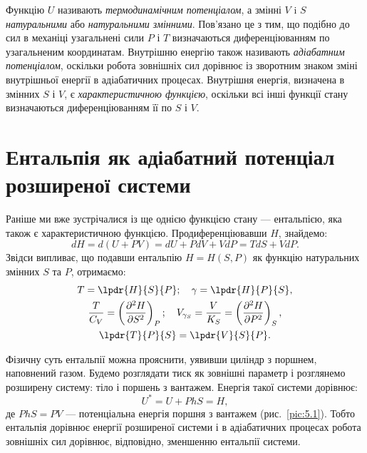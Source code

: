 Функцію $U$ називають \emph{термодинамічним потенціалом}, а змінні $V$ i $S$ \emph{натуральними} або \emph{натуральними змінними}. Пов'язано це з тим, що подібно до сил в механіці узагальнені сили $P$ і $T$ визначаються диференціюванням по узагальненим координатам. Внутрішню енергію також називають \emph{адіабатним потенціалом}, оскільки робота зовнішніх сил дорівнює із зворотним знаком зміні внутрішньої енергії в адіабатичних процесах. Внутрішня енергія, визначена в змінних $S$ і $V$, є \emph{характеристичною функцією}, оскільки всі інші функції стану визначаються диференціюванням її по $S$ і $V$.

\section{Ентальпія як адіабатний потенціал розширеної системи}

Раніше ми вже зустрічалися із ще однією функцією стану --- ентальпією, яка також є характеристичною функцією. Продиференціювавши $H$, знайдемо:
\begin{equation}\label{5.7}
	dH = d(U+PV) = dU + PdV + VdP = TdS + VdP.
\end{equation}
Звідси випливає, що подавши ентальпію $H=H(S,P)$ як функцію натуральних змінних $S$ та $P$, отримаємо:
\begin{gather}
	T = \lpdr{H}{S}{P}; \quad \gamma = \lpdr{H}{P}{S}, \label{5.8} \\
	\dfrac{T}{C_V} = \left(\dfrac{\partial^2H}{\partial S^2}\right)_{P}; \quad V_{\gamma_{S}}= \dfrac{V}{K_{S}}=\left(\dfrac{\partial^2H}{\partial P^2}\right)_{S}, \label{5.9} \\
	\lpdr{T}{P}{S}=\lpdr{V}{S}{P}. \label{5.10}
\end{gather}

Фізичну суть ентальпії можна прояснити, уявивши циліндр з поршнем, наповнений газом. Будемо розглядати тиск як зовнішні параметр і розглянемо розширену систему: тіло і поршень з вантажем. Енергія такої системи дорівнює:
\begin{equation}\label{5.11}
	U^* = U + PhS = H,
\end{equation}
де $PhS=PV$ --- потенціальна енергія поршня з вантажем (рис.~\ref{pic:5.1}). Тобто ентальпія дорівнює енергії розширеної системи і в адіабатичних процесах робота зовнішніх сил дорівнює, відповідно, зменшенню ентальпії системи.

